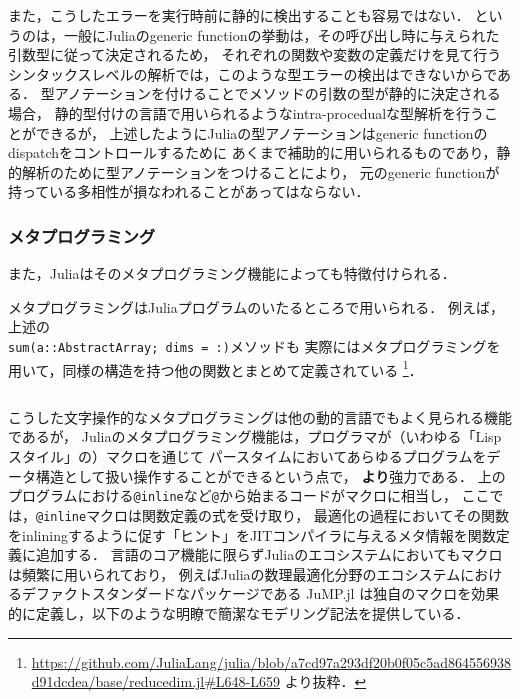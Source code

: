 
また，こうしたエラーを実行時前に静的に検出することも容易ではない．
というのは，一般にJuliaのgeneric functionの挙動は，その呼び出し時に与えられた引数型に従って決定されるため，
それぞれの関数や変数の定義だけを見て行うシンタックスレベルの解析では，このような型エラーの検出はできないからである．
型アノテーションを付けることでメソッドの引数の型が静的に決定される場合，
静的型付けの言語で用いられるようなintra-procedualな型解析を行うことができるが，
上述したようにJuliaの型アノテーションはgeneric functionのdispatchをコントロールするために
あくまで補助的に用いられるものであり，静的解析のために型アノテーションをつけることにより，
元のgeneric functionが持っている多相性が損なわれることがあってはならない．

\subsubsection{メタプログラミング} \label{subsubsection:metaprogramming}

また，Juliaはそのメタプログラミング機能によっても特徴付けられる．

メタプログラミングはJuliaプログラムのいたるところで用いられる．
例えば，上述の\\\verb|sum(a::AbstractArray; dims = :)|メソッドも
実際にはメタプログラミングを用いて，同様の構造を持つ他の関数とまとめて定義されている
\footnote{
  \url{https://github.com/JuliaLang/julia/blob/a7cd97a293df20b0f05c5ad864556938d91dcdea/base/reducedim.jl\#L648-L659}
  より抜粋．
}．

\inputminted[frame=lines, firstline=3, lastline=12, breaklines]{julia}{src/sums_def.jl}

こうした文字操作的なメタプログラミングは他の動的言語でもよく見られる機能であるが，
Juliaのメタプログラミング機能は，プログラマが（いわゆる「Lispスタイル」の）マクロを通じて
パースタイムにおいてあらゆるプログラムをデータ構造として扱い操作することができるという点で，
\textbf{より}強力である．
上のプログラムにおける\verb|@inline|など\verb|@|から始まるコードがマクロに相当し，
ここでは，\verb|@inline|マクロは関数定義の式を受け取り，
最適化の過程においてその関数をinliningするように促す「ヒント」をJITコンパイラに与えるメタ情報を関数定義に追加する．
言語のコア機能に限らずJuliaのエコシステムにおいてもマクロは頻繁に用いられており，
例えばJuliaの数理最適化分野のエコシステムにおけるデファクトスタンダードなパッケージである
JuMP.jl\cite{DunningHuchetteLubin2017}
は独自のマクロを効果的に定義し，以下のような明瞭で簡潔なモデリング記法を提供している．

